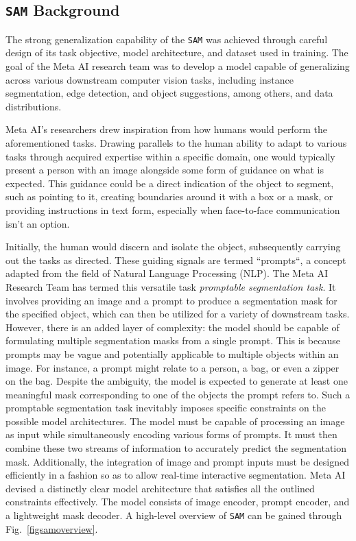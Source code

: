 \subsection{\texttt{SAM} Background}\label{SAMbg}
The strong generalization capability of the \texttt{SAM} was achieved through careful design of its task objective, model architecture, and dataset used in training. The goal of the Meta AI research team was to develop a model capable of generalizing across various downstream computer vision tasks, including instance segmentation, edge detection, and object suggestions, among others, and data distributions.

Meta AI's researchers drew inspiration from how humans would perform the aforementioned tasks. Drawing parallels to the human ability to adapt to various tasks through acquired expertise within a specific domain, one would typically present a person with an image alongside some form of guidance on what is expected. This guidance could be a direct indication of the object to segment, such as pointing to it, creating boundaries around it with a box or a mask, or providing instructions in text form, especially when face-to-face communication isn't an option.

Initially, the human would discern and isolate the object, subsequently carrying out the tasks as directed. These guiding signals are termed “prompts“, a concept adapted from the field of Natural Language Processing (NLP). The Meta AI Research Team has termed this versatile task \textit{promptable segmentation task}. It involves providing an image and a prompt to produce a segmentation mask for the specified object, which can then be utilized for a variety of downstream tasks. However, there is an added layer of complexity: the model should be capable of formulating multiple segmentation masks from a single prompt. This is because prompts may be vague and potentially applicable to multiple objects within an image. For instance, a prompt might relate to a person, a bag, or even a zipper on the bag. Despite the ambiguity, the model is expected to generate at least one meaningful mask corresponding to one of the objects the prompt refers to.
Such a promptable segmentation task inevitably imposes specific constraints on the possible model architectures. The model must be capable of processing an image as input while simultaneously encoding various forms of prompts. It must then combine these two streams of information to accurately predict the segmentation mask. Additionally, the integration of image and prompt inputs must be designed efficiently in a fashion so as to allow real-time interactive segmentation. 
Meta AI devised a distinctly clear model architecture that satisfies all the outlined constraints effectively. The model consists of image encoder, prompt encoder, and a lightweight mask decoder. A high-level overview of \texttt{SAM} can be gained through Fig.~\ref{figsamoverview}.

